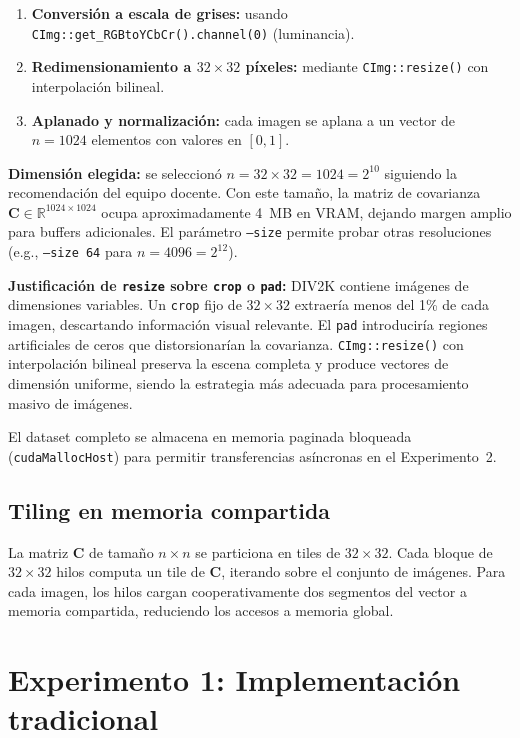 \documentclass[12pt,a4paper]{article}
\begin{document}
\begin{enumerate}
    \item \textbf{Conversión a escala de grises:} usando
          \texttt{CImg::get\_RGBtoYCbCr().channel(0)} (luminancia).
    \item \textbf{Redimensionamiento a $32 \times 32$ píxeles:} mediante
          \texttt{CImg::resize()} con interpolación bilineal.
    \item \textbf{Aplanado y normalización:} cada imagen se aplana a un vector
          de $n = 1024$ elementos con valores en $[0, 1]$.
\end{enumerate}

\textbf{Dimensión elegida:} se seleccionó $n = 32 \times 32 = 1024 = 2^{10}$
siguiendo la recomendación del equipo docente. Con este tamaño, la matriz de
covarianza $\mathbf{C} \in \mathbb{R}^{1024 \times 1024}$ ocupa aproximadamente
4~MB en VRAM, dejando margen amplio para buffers adicionales. El parámetro
\texttt{--size} permite probar otras resoluciones (e.g., \texttt{--size 64}
para $n=4096=2^{12}$).

\textbf{Justificación de \texttt{resize} sobre \texttt{crop} o \texttt{pad}:}
DIV2K contiene imágenes de dimensiones variables. Un \texttt{crop} fijo de
$32 \times 32$ extraería menos del 1\% de cada imagen, descartando información
visual relevante. El \texttt{pad} introduciría regiones artificiales de ceros
que distorsionarían la covarianza. \texttt{CImg::resize()} con interpolación
bilineal preserva la escena completa y produce vectores de dimensión uniforme,
siendo la estrategia más adecuada para procesamiento masivo de imágenes.

El dataset completo se almacena en memoria paginada bloqueada
(\texttt{cudaMallocHost}) para permitir transferencias asíncronas en el
Experimento~2.

\subsection{Tiling en memoria compartida}

La matriz $\mathbf{C}$ de tamaño $n \times n$ se particiona en tiles de
$32 \times 32$. Cada bloque de $32 \times 32$ hilos computa un tile de $\mathbf{C}$,
iterando sobre el conjunto de imágenes. Para cada imagen, los hilos cargan
cooperativamente dos segmentos del vector a memoria compartida,
reduciendo los accesos a memoria global.

\section{Experimento 1: Implementación tradicional}
\end{document}
